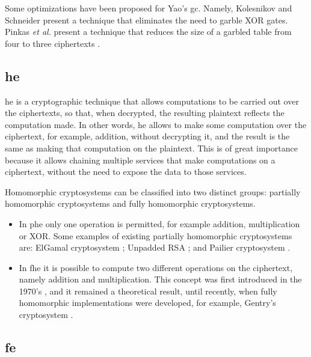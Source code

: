 Some optimizations have been proposed for Yao's \ac{gc}. Namely, Kolesnikov and Schneider \cite{kolesnikov2008improved} present a technique that eliminates the need to garble XOR gates. Pinkas \textit{et al.} present a technique that reduces the size of a garbled table from four to three ciphertexts \cite{pinkas2009secure}.


\subsection{\acl{he}}
\label{ssec:HomomorphicEncryption}


\acf{he} \cite{rivest1978data} is a cryptographic technique that allows computations to be carried out over the ciphertexts, so that, when decrypted, the resulting plaintext reflects the computation made. In other words, \ac{he} allows to make some computation over the ciphertext, for example, addition, without decrypting it, and the result is the same as making that computation on the plaintext. This is of great importance because it allows chaining multiple services that make computations on a ciphertext, without the need to expose the data to those services. 

Homomorphic cryptosystems can be classified into two distinct groups: partially homomorphic cryptosystems and fully homomorphic cryptosystems.

\begin{itemize}
    
    \item In \ac{phe} only one operation is permitted, for example addition, multiplication or XOR. Some examples of existing partially homomorphic cryptosystems are:
    ElGamal cryptosystem \cite{elgamal1985public}; Unpadded RSA \cite{rivest1978method}; and Pailier cryptosystem \cite{paillier1999public}.

    \item In \ac{fhe} it is possible to compute two different operations on the ciphertext, namely addition and multiplication. This concept was first introduced in the 1970's \cite{rivest1978data}, and it remained a theoretical result, until recently, when fully homomorphic implementations were developed, for example, Gentry's cryptosystem \cite{gentry2009fully}.
\end{itemize}


\subsection{\acl{fe}}
\label{ssec:FunctionalEncryption}


